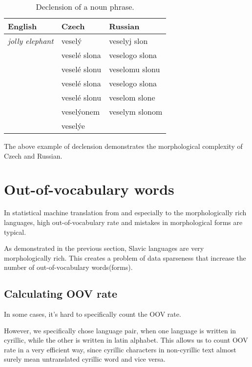 \documentclass[11pt,letterpaper]{article}
\begin{document}
\begin{table}
\begin{center}
\begin{tabular}{|l|l|l|}
\hline
English & Czech & Russian \\ \hline
\textit{jolly elephant} & veselý & veselyj slon \\
 & veselé slona & veselogo slona \\
 & veselé slonu & veselomu slonu \\
 & veselé slona & veselogo slona \\ 
 & veselé slonu & veselom slone\\
 & veselýonem& veselym slonom\\
 & veselýe &\\
\hline
\end{tabular}
\end{center}
\caption{Declension of a noun phrase.}
\label{tab:slon}
\end{table}

The above example of declension demonstrates the morphological complexity of Czech and Russian.

\section{Out-of-vocabulary words}
In statistical machine translation from and especially to the morphologically rich languages,
high out-of-vocabulary rate and mistakes in morphological forms are typical.

As demonstrated in the previous section, Slavic languages are very morphologically rich. This creates a problem of data sparseness that increase the number of out-of-vocabulary words(forms).

\subsection{Calculating OOV rate}
In some cases, it's hard to specifically count the OOV rate.

However, we specifically chose language pair, when one language is written in cyrillic, while the other is written in latin alphabet. This allows us to count OOV rate in a very efficient way, since cyrillic characters in non-cyrillic text almost surely mean untranslated cyrillic word and vice versa.
\end{document}
